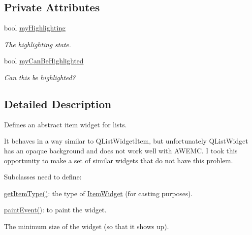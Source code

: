 \subsection*{Private Attributes}
\begin{DoxyCompactItemize}
\item 
\hypertarget{class_u_i_1_1_item_widget_a58d1d75e2d4cb40003913dcbc6014709}{bool \hyperlink{class_u_i_1_1_item_widget_a58d1d75e2d4cb40003913dcbc6014709}{my\-Highlighting}}\label{class_u_i_1_1_item_widget_a58d1d75e2d4cb40003913dcbc6014709}

\begin{DoxyCompactList}\small\item\em The highlighting state. \end{DoxyCompactList}\item 
\hypertarget{class_u_i_1_1_item_widget_a22fffc103f56d031f42ecef9ee95b168}{bool \hyperlink{class_u_i_1_1_item_widget_a22fffc103f56d031f42ecef9ee95b168}{my\-Can\-Be\-Highlighted}}\label{class_u_i_1_1_item_widget_a22fffc103f56d031f42ecef9ee95b168}

\begin{DoxyCompactList}\small\item\em Can this be highlighted? \end{DoxyCompactList}\end{DoxyCompactItemize}


\subsection{Detailed Description}
Defines an abstract item widget for lists. 

It behaves in a way similar to {\ttfamily Q\-List\-Widget\-Item}, but unfortunately {\ttfamily Q\-List\-Widget} has an opaque background and does not work well with A\-W\-E\-M\-C. I took this opportunity to make a set of similar widgets that do not have this problem.

Subclasses need to define\-:
\begin{DoxyItemize}
\item {\ttfamily \hyperlink{class_u_i_1_1_item_widget_a83f42fd7ce38235e3fee565e32c4abbd}{get\-Item\-Type()}}\-: the type of {\ttfamily \hyperlink{class_u_i_1_1_item_widget}{Item\-Widget}} (for casting purposes).
\item {\ttfamily \hyperlink{class_u_i_1_1_item_widget_a636f6170e71d0dded72cf7fb040cbc3e}{paint\-Event()}}\-: to paint the widget.
\item The minimum size of the widget (so that it shows up). 
\end{DoxyItemize}

